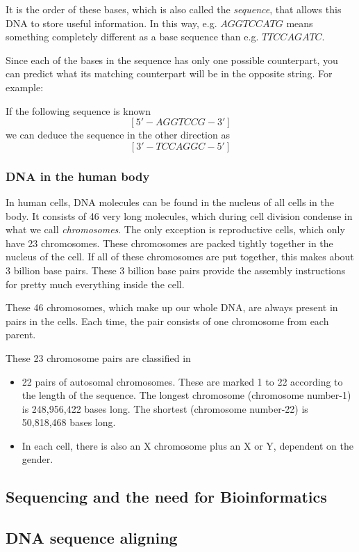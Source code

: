 It is the order of these bases, which is also called the \emph{sequence}, that allows this DNA to store useful information. In this way, e.g. $AGGTCCATG$ means something completely different as a base sequence than e.g. $TTCCAGATC$.

Since each of the bases in the sequence has only one possible counterpart, you can predict what its matching counterpart will be in the opposite string. For example:

If the following sequence is known
$$[5' - AGGTCCG - 3']$$
we can deduce the sequence in the other direction as
$$[3' - TCCAGGC - 5']$$

\subsubsection{DNA in the human body}

In human cells, DNA molecules can be found in the nucleus of all cells in the body. It consists of 46 very long molecules, which during cell division condense in what we call \emph{chromosomes}. The only exception is reproductive cells, which only have 23 chromosomes. These chromosomes are packed tightly together in the nucleus of the cell. If all of these chromosomes are put together, this makes about 3 billion base pairs. These 3 billion base pairs provide the assembly instructions for pretty much everything inside the cell.

These 46 chromosomes, which make up our whole DNA, are always present in pairs in the cells. Each time, the pair consists of one chromosome from each parent. 

These 23 chromosome pairs are classified in 
\begin{itemize}
	\item 22 pairs of autosomal chromosomes. These are marked 1 to 22 according to the length of the sequence. The longest chromosome (chromosome number-1) is 248,956,422 bases long. The shortest (chromosome number-22) is 50,818,468 bases long.
	\item In each cell, there is also an X chromosome plus an X or Y, dependent on the gender.
\end{itemize}

\subsection{Sequencing and the need for Bioinformatics}
\subsection{DNA sequence aligning}
